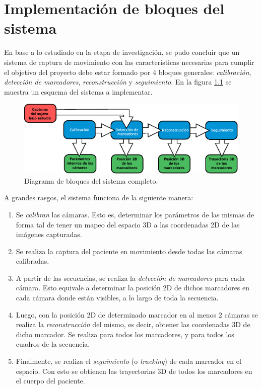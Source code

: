 \chapter{Implementación de bloques del sistema}
\label{sec:implementacion_bloques_sistema}


En base a lo estudiado en la etapa de investigación, se pudo concluir que un sistema de captura de movimiento con las características necesarias para cumplir el objetivo del proyecto debe estar formado por 4 bloques generales: \emph{calibración}, \emph{detección de marcadores}, \emph{reconstrucción} y \emph{seguimiento}. En la figura \ref{bloquesSist} se muestra un esquema del sistema a implementar.

\begin{figure}[H]
\hspace{-0.5cm}
\includegraphics[scale=0.7]{img/Sistema_completo/Diagrama_de_bloques.eps}
\caption{Diagrama de bloques del sistema completo.}
\label{bloquesSist}
\end{figure}

A grandes rasgos, el sistema funciona de la siguiente manera:

\begin{enumerate}
	\item Se \emph{calibran} las cámaras. Esto es, determinar los parámetros de las mismas de forma tal de tener un mapeo del espacio 3D a las coordenadas 2D de las imágenes capturadas.
	\item Se realiza la captura del paciente en movimiento desde todas las cámaras calibradas.
	\item A partir de las secuencias, se realiza la \emph{detección de marcadores} para cada cámara. Esto equivale a determinar la posición 2D de dichos marcadores en cada cámara donde están visibles, a lo largo de toda la secuencia.
	\item Luego, con la posición 2D de determinado marcador en al menos 2 cámaras se realiza la \emph{reconstrucción} del mismo, es decir, obtener las coordenadas 3D de dicho marcador. Se realiza para todos los marcadores, y para todos los cuadros de la secuencia.
	\item Finalmente, se realiza el \emph{seguimiento} (o \emph{tracking}) de cada marcador en el espacio. Con esto se obtienen las trayectorias 3D de todos los marcadores en el cuerpo del paciente.
\end{enumerate}

